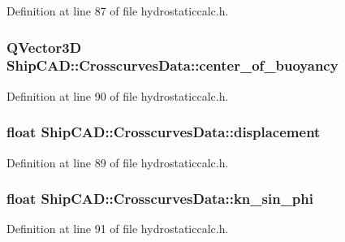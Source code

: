 Definition at line 87 of file hydrostaticcalc.\-h.

\hypertarget{structShipCAD_1_1CrosscurvesData_a0de723cd5ae0e18953fb7ad5a0f5dadf}{
\subsubsection[{center\-\_\-of\-\_\-buoyancy}]{\setlength{\rightskip}{0pt plus 5cm}Q\-Vector3\-D Ship\-C\-A\-D\-::\-Crosscurves\-Data\-::center\-\_\-of\-\_\-buoyancy}}\label{structShipCAD_1_1CrosscurvesData_a0de723cd5ae0e18953fb7ad5a0f5dadf}


Definition at line 90 of file hydrostaticcalc.\-h.

\hypertarget{structShipCAD_1_1CrosscurvesData_a9a7baa66159e203888390eaa63caf708}{
\subsubsection[{displacement}]{\setlength{\rightskip}{0pt plus 5cm}float Ship\-C\-A\-D\-::\-Crosscurves\-Data\-::displacement}}\label{structShipCAD_1_1CrosscurvesData_a9a7baa66159e203888390eaa63caf708}


Definition at line 89 of file hydrostaticcalc.\-h.

\hypertarget{structShipCAD_1_1CrosscurvesData_a55150860fed821e314e18b72f1975749}{
\subsubsection[{kn\-\_\-sin\-\_\-phi}]{\setlength{\rightskip}{0pt plus 5cm}float Ship\-C\-A\-D\-::\-Crosscurves\-Data\-::kn\-\_\-sin\-\_\-phi}}\label{structShipCAD_1_1CrosscurvesData_a55150860fed821e314e18b72f1975749}


Definition at line 91 of file hydrostaticcalc.\-h.

